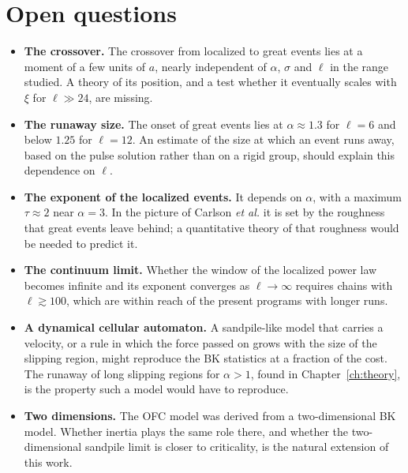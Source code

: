 \section{Open questions}

\begin{itemize}
  \item \textbf{The crossover.} The crossover from localized to great events lies at a moment of a few units of $a$, nearly independent of $\alpha$, $\sigma$ and $\ell$ in the range
    studied. A theory of its position, and a test whether it eventually scales with $\xi$ for $\ell\gg24$, are missing.
  \item \textbf{The runaway size.} The onset of great events lies at $\alpha\approx1.3$ for $\ell=6$ and below $1.25$ for $\ell = 12$. An estimate of the size at which an
    event runs away, based on the pulse solution rather than on a rigid group, should explain this dependence on $\ell$.
  \item \textbf{The exponent of the localized events.} It depends on $\alpha$, with a maximum $\tau\approx2$ near $\alpha = 3$. In the picture of Carlson \emph{et al.} it is set by
    the roughness that great events leave behind; a quantitative theory of that roughness would be needed to predict it.
  \item \textbf{The continuum limit.} Whether the window of the localized power law becomes infinite and its exponent converges as $\ell\to\infty$ requires chains with $\ell\gtrsim100$,
    which are within reach of the present programs with longer runs.
  \item \textbf{A dynamical cellular automaton.} A sandpile-like model that carries a velocity, or a rule in which the force passed on grows with the size of the slipping region,
    might reproduce the BK statistics at a fraction of the cost. The runaway of long slipping regions for $\alpha>1$, found in Chapter~\ref{ch:theory}, is the property such a model would have to reproduce.
  \item \textbf{Two dimensions.} The OFC model was derived from a two-dimensional BK model. Whether inertia plays the same role there, and whether the two-dimensional sandpile limit
    is closer to criticality, is the natural extension of this work.
\end{itemize}
